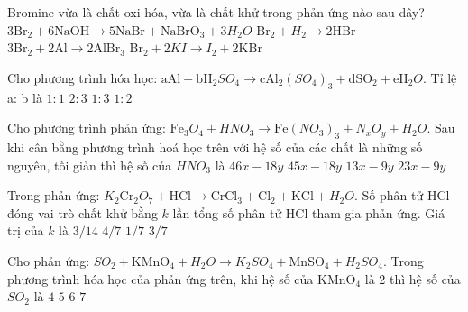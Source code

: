 \begin{ex}Bromine vừa là chất oxi hóa, vừa là chất khử trong phản ứng nào sau dây?
	\choice
	{\True $3 \mathrm{Br}_2+6 \mathrm{NaOH} \to 5 \mathrm{NaBr}+\mathrm{NaBrO}_3+3 H_2O$}
	{$\mathrm{Br}_2+H_2\to 2\mathrm{HBr}$}
	{$3\mathrm{Br}_2+2\mathrm{Al} \to 2\mathrm{AlBr}_3$}
	{$\mathrm{Br}_2+2KI \to I_2+2\mathrm{KBr}$}
	\loigiai{}
\end{ex}

\begin{ex}[Đề TSCĐ-2014]
	Cho phương trình hóa học:
	$\mathrm{aAl}+\mathrm{bH}_2SO_4\to \mathrm{cAl}_2\left(SO_4\right)_3+\mathrm{dSO}_2+\mathrm{eH}_2O$. Tỉ lệ a: b là
	\choice
	{$1: 1$}
	{$2: 3$}
	{\True $1: 3$}
	{$1: 2$}
	\loigiai{}
\end{ex}

\begin{ex}
	Cho phương trình phản ứng:
	$\mathrm{Fe}_3 O_4+HNO_3 \to \mathrm{Fe}\left(NO_3\right)_3+N_x O_y+H_2O$. Sau khi cân bằng phương trình hoá học trên với hệ số của các chất là những số nguyên, tối giản thì hệ số của $HNO_3$ là
	\choice
	{\True $46x-18y$}
	{$45x-18y$}
	{$13x-9y$}
	{$23x-9y$}
	\loigiai{}
\end{ex}

\begin{ex}[Đề TSĐH A-2010]
	Trong phản ứng: $K_2 \mathrm{Cr}_2 O_7+\mathrm{HCl} \to \mathrm{CrCl}_3+\mathrm{Cl}_2+\mathrm{KCl}+H_2O$. Số phân tử $\mathrm{HCl}$ đóng vai trò chất khử bằng $k$ lần tổng số phân tử $\mathrm{HCl}$ tham gia phản ứng. Giá trị của $k$ là
	\choice
	{$3/ 14$}
	{$4/ 7$}
	{$1/ 7$}
	{\True $3/ 7$}
	\loigiai{}
\end{ex}

\begin{ex}[Đề TSĐH B-2014]
	Cho phản ứng: $SO_2+\mathrm{KMnO}_4+H_2O \to K_2 SO_4+\mathrm{MnSO}_4+H_2 SO_4$. Trong phương trình hóa học của phản ứng trên, khi hệ số của $\mathrm{KMnO}_4$ là 2 thì hệ số của $SO_2$ là
	\choice
	{$4$}
	{\True $5$}
	{$6$}
	{$7$}
	\loigiai{}
\end{ex}

